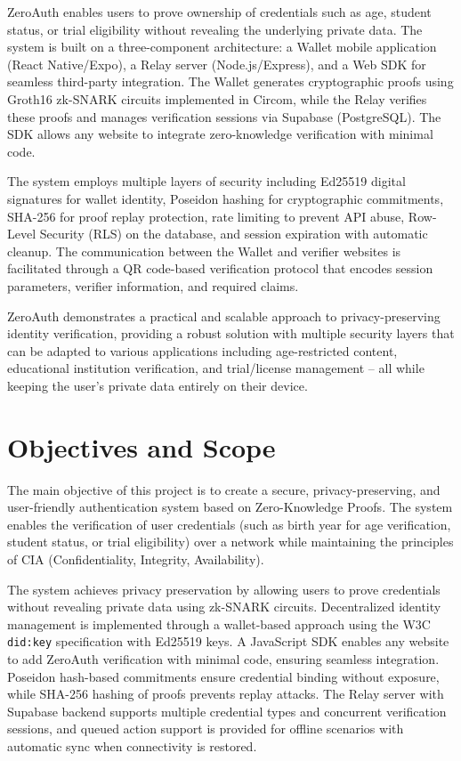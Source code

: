 ZeroAuth enables users to prove ownership of credentials such as age, student status, or trial eligibility without revealing the underlying private data. The system is built on a three-component architecture: a Wallet mobile application (React Native/Expo), a Relay server (Node.js/Express), and a Web SDK for seamless third-party integration. The Wallet generates cryptographic proofs using Groth16 zk-SNARK circuits implemented in Circom, while the Relay verifies these proofs and manages verification sessions via Supabase (PostgreSQL). The SDK allows any website to integrate zero-knowledge verification with minimal code.

The system employs multiple layers of security including Ed25519 digital signatures for wallet identity, Poseidon hashing for cryptographic commitments, SHA-256 for proof replay protection, rate limiting to prevent API abuse, Row-Level Security (RLS) on the database, and session expiration with automatic cleanup. The communication between the Wallet and verifier websites is facilitated through a QR code-based verification protocol that encodes session parameters, verifier information, and required claims.

ZeroAuth demonstrates a practical and scalable approach to privacy-preserving identity verification, providing a robust solution with multiple security layers that can be adapted to various applications including age-restricted content, educational institution verification, and trial/license management -- all while keeping the user's private data entirely on their device.

\section{Objectives and Scope}

The main objective of this project is to create a secure, privacy-preserving, and user-friendly authentication system based on Zero-Knowledge Proofs. The system enables the verification of user credentials (such as birth year for age verification, student status, or trial eligibility) over a network while maintaining the principles of CIA (Confidentiality, Integrity, Availability).

The system achieves privacy preservation by allowing users to prove credentials without revealing private data using zk-SNARK circuits. Decentralized identity management is implemented through a wallet-based approach using the W3C \texttt{did:key} specification with Ed25519 keys. A JavaScript SDK enables any website to add ZeroAuth verification with minimal code, ensuring seamless integration. Poseidon hash-based commitments ensure credential binding without exposure, while SHA-256 hashing of proofs prevents replay attacks. The Relay server with Supabase backend supports multiple credential types and concurrent verification sessions, and queued action support is provided for offline scenarios with automatic sync when connectivity is restored.

